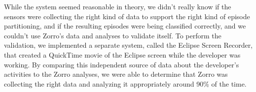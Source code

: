 \documentclass[10pt,twocolumn]{article}
\begin{document}
While the system seemed reasonable in theory, we didn't really know if the
sensors were collecting the right kind of data to support the right kind of
episode partitioning, and if the resulting episodes were being classified
correctly, and we couldn't use Zorro's data and analyses to validate
itself.  To perform the validation, we implemented a separate system,
called the Eclipse Screen Recorder, that created a QuickTime movie of the
Eclipse screen while the developer was working.  By comparing this
independent source of data about the developer's activities to the Zorro
analyses, we were able to determine that Zorro was collecting the right
data and analyzing it appropriately around 90\% of the time.  


 


\end{document}
